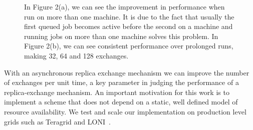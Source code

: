 \documentclass[a4paper,10pt]{article}
\begin{document}
\begin{figure}
\centering
{}
\hspace{0.5cm}
\caption{\small In Figure 2(a), we can see the improvement in performance when run on more than one machine. It is due to the fact that usually the first queued job becomes active before the second on a machine and running jobs on more than one machine solves this problem. In Figure 2(b), we can see consistent performance over prolonged runs, making 32, 64 and 128 exchanges.}
\label{fig:graphs}
\end{figure}


%

With an asynchronous replica exchange mechanism we can improve the
number of exchanges per unit time, a key parameter in judging the
performance of a replica-exchange mechanism.  An important motivation
for this work is to implement a scheme that does not depend on a
static, well defined model of resource availability. We test and scale
our implementation on production level grids such as Teragrid and
LONI~\cite{LONI_web}.
\end{document}
